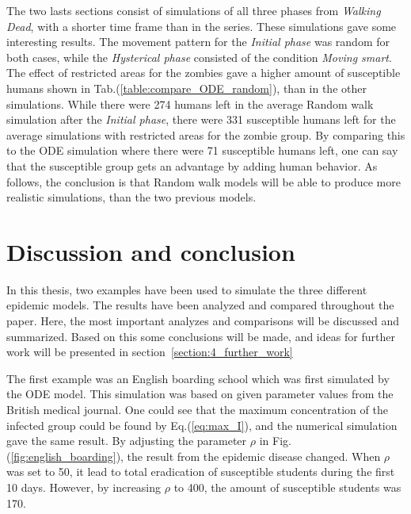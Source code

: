\documentclass[%
twoside,                 %
final,                   %
chapterprefix=true,      %
open=right               %
10pt]{book}
\begin{document}
\vspace{3mm}




\vspace{3mm}


The two lasts sections consist of simulations of all three phases from \emph{Walking Dead}, with a shorter time frame than in the series. These simulations gave some interesting results. The movement pattern for the \emph{Initial phase} was random for both cases, while the \emph{Hysterical phase} consisted of the condition \emph{Moving smart}. The effect of restricted areas for the zombies gave a higher amount of susceptible humans shown in Tab.(\ref{table:compare_ODE_random}), than in the other simulations. While there were 274 humans left in the average Random walk simulation after the \emph{Initial phase}, there were 331 susceptible humans left for the average simulations with restricted areas for the zombie group. By comparing this to the ODE simulation where there were 71 susceptible humans left, one can say that the susceptible group gets an advantage by adding human behavior. As follows, the conclusion is that Random walk models will be able to produce more realistic simulations, than the two previous models.


\chapter{Discussion and conclusion}
In this thesis, two examples have been used to simulate the three different epidemic models. The results have been analyzed and compared throughout the paper. Here, the most important analyzes and comparisons will be discussed and summarized. Based on this some conclusions will be made, and ideas for further work will be presented in section~\ref{section:4_further_work}


\vspace{3mm}




\vspace{3mm}


The first example was an English boarding school which was first simulated by the ODE model. This simulation was based on given parameter values from the British medical journal. One could see that the maximum concentration of the infected group could be found by Eq.(\ref{eq:max_I}), and the numerical simulation gave the same result. By adjusting the parameter $\rho$ in Fig.(\ref{fig:english_boarding}), the result from the epidemic disease changed. When $\rho$ was set to 50, it lead to total eradication of susceptible students during the first 10 days. However, by increasing $\rho$ to 400, the amount of susceptible students was 170. 
\end{document}

